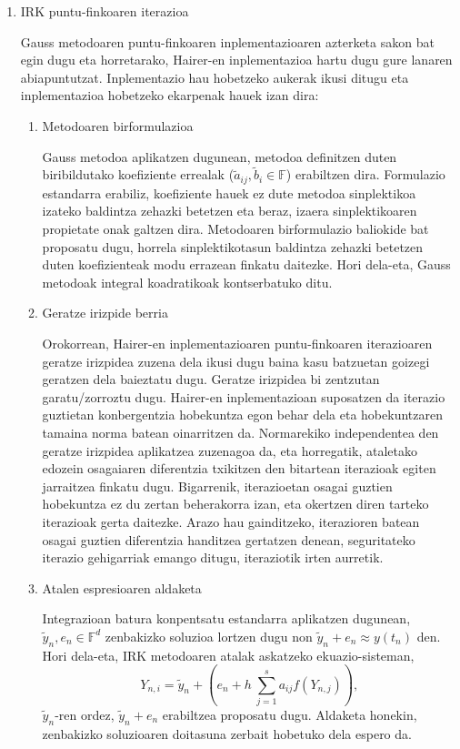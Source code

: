\begin{enumerate}
\item IRK puntu-finkoaren iterazioa

Gauss metodoaren puntu-finkoaren inplementazioaren azterketa sakon bat egin dugu eta horretarako, Hairer-en inplementazioa \cite{Hairer2008} hartu dugu gure lanaren abiapuntutzat. Inplementazio hau hobetzeko aukerak ikusi ditugu eta inplementazioa hobetzeko ekarpenak hauek izan dira:  

\begin{enumerate}
\item Metodoaren birformulazioa

Gauss metodoa aplikatzen dugunean, metodoa definitzen duten biribildutako koefiziente errealak ($\tilde{a}_{ij}, \tilde{b}_i \in \mathbb{F}$) erabiltzen dira. Formulazio estandarra erabiliz, koefiziente hauek ez dute metodoa sinplektikoa izateko baldintza zehazki betetzen eta beraz, izaera sinplektikoaren propietate onak galtzen dira. Metodoaren birformulazio baliokide bat proposatu dugu, horrela sinplektikotasun baldintza zehazki betetzen duten koefizienteak modu errazean finkatu daitezke. Hori dela-eta, Gauss metodoak integral koadratikoak kontserbatuko ditu.

\item Geratze irizpide berria

Orokorrean, Hairer-en inplementazioaren puntu-finkoaren iterazioaren geratze irizpidea zuzena dela ikusi dugu baina kasu batzuetan goizegi geratzen dela baieztatu dugu. Geratze irizpidea bi zentzutan garatu/zorroztu dugu. Hairer-en inplementazioan suposatzen da iterazio guztietan konbergentzia hobekuntza egon behar dela eta hobekuntzaren tamaina norma batean oinarritzen da. Normarekiko independentea den geratze irizpidea aplikatzea zuzenagoa da, eta horregatik, ataletako edozein osagaiaren diferentzia txikitzen den bitartean iterazioak egiten jarraitzea finkatu dugu. Bigarrenik, iterazioetan osagai guztien hobekuntza ez du zertan beherakorra izan, eta okertzen diren tarteko iterazioak gerta daitezke. Arazo hau gainditzeko, iterazioren batean osagai guztien diferentzia handitzea gertatzen denean, seguritateko iterazio gehigarriak emango ditugu, iteraziotik irten aurretik.   

\item Atalen espresioaren aldaketa

Integrazioan batura konpentsatu estandarra aplikatzen dugunean, $\tilde{y}_n, e_n \in \mathbb{F}^d$ zenbakizko soluzioa  lortzen dugu non $\tilde{y}_n+e_n \approx y(t_n)$ den. Hori dela-eta, IRK metodoaren atalak askatzeko ekuazio-sisteman,
\begin{equation*}
Y_{n,i}=\tilde{y}_n + \left(e_n+ h \ \sum_{j=1}^{s} a_{ij} f(Y_{n,j}) \right),
\end{equation*}
$\tilde{y}_n$-ren ordez, $\tilde{y}_n+e_n$ erabiltzea proposatu dugu. Aldaketa honekin, zenbakizko soluzioaren doitasuna zerbait hobetuko dela espero da.
 

\end{enumerate}
\end{enumerate}
